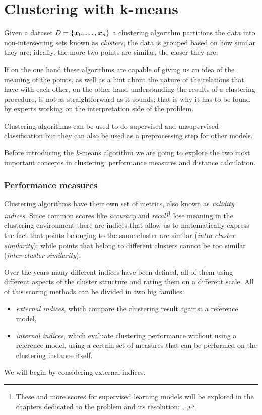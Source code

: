 \section{Clustering with k-means}
\label{sec:kmeans}
Given a dataset $D = \{\boldsymbol{x}_0, \allowbreak\ldots\allowbreak, \boldsymbol{x}_n\}$ a clustering algorithm partitions the data into non-intersecting sets
known as \emph{clusters}, the data is grouped based on how similar they are; ideally, the more two
points are similar, the closer they are.

If on the one hand these algorithms are capable of giving us an idea of the
meaning of the points, as well as a hint about the nature of the relations that have with each
other, on the other hand understanding the results of a clustering procedure, is not as
straightforward as it sounds; that is why it has to be found by experts working on the
interpretation side of the problem.

Clustering algorithms can be used to do supervised and unsupervised classification but they can also
be used as a preprocessing step for other models.

\medskip

Before introducing the $k$-means algorithm we are going to explore the two most important concepts
in clustering: performance measures and distance calculation.

\subsubsection{Performance measures}
\label{ssec:performance-measures}
Clustering algorithms have their own set of metrics, also known as \emph{validity indices}. Since
common scores like \emph{accuracy} and \emph{recall}\footnote{These and more scores for supervised
learning models will be explored in the chapters dedicated to the problem and its resolution: ,
, } lose meaning in the clustering
environment there are indices that allow us to matematically express the fact that points belonging
to the same cluster are similar (\emph{intra-cluster similarity}); while points that belong to
different clusters cannot be too similar (\emph{inter-cluster similarity}).

\medskip

Over the years many different indices have been defined, all of them using different aspects of the
cluster structure and rating them on a different scale. All of this scoring methods can be divided
in two big families:
\begin{itemize}
	\item \emph{external indices}, which compare the clustering result against a reference model,
	\item \emph{internal indices}, which evaluate clustering performance without using a
		reference model, using a certain set of measures that can be performed on the
		clustering instance itself.
\end{itemize}
We will begin by considering external indices.

